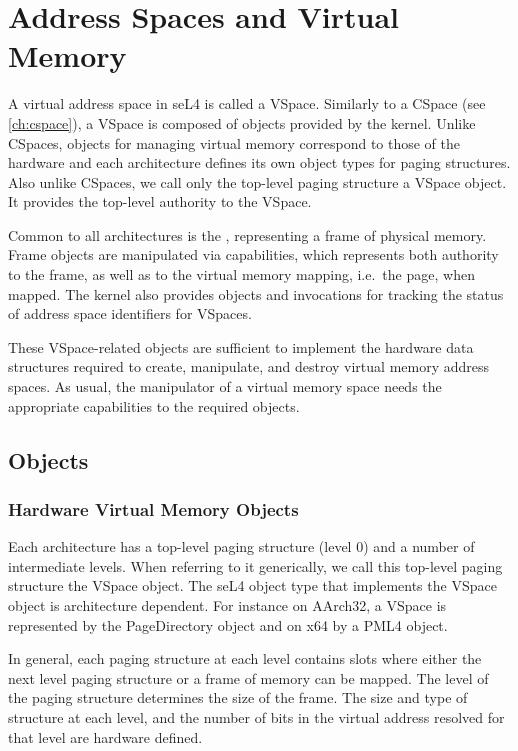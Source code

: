 %
%
%

\chapter{\label{ch:vspace}Address Spaces and Virtual Memory}

A virtual address space in seL4 is called a VSpace. Similarly to a CSpace (see \autoref{ch:cspace}),
a VSpace is composed of objects provided by the kernel. Unlike CSpaces, objects for managing virtual
memory correspond to those of the hardware and each architecture defines its own object types for
paging structures. Also unlike CSpaces, we call only the top-level paging structure a VSpace object.
It provides the top-level authority to the VSpace.

Common to all architectures is the , representing a frame of physical memory. Frame
objects are manipulated via  capabilities, which represents both authority to the frame,
as well as to the virtual memory mapping, i.e.\ the page, when mapped. The kernel also provides
 objects and  invocations for tracking the status of address space
identifiers for VSpaces.

These VSpace-related objects are sufficient to implement the hardware data structures required to
create, manipulate, and destroy virtual memory address spaces. As usual, the manipulator of a
virtual memory space needs the appropriate capabilities to the required objects.

\section{Objects}

\subsection{Hardware Virtual Memory Objects}

Each architecture has a top-level paging structure (level 0) and a number of intermediate levels.
When referring to it generically, we call this top-level paging structure the VSpace object. The
seL4 object type that implements the VSpace object is architecture dependent. For instance on
AArch32, a VSpace is represented by the PageDirectory object and on x64 by a PML4 object.

In general, each paging structure at each level contains slots where either the next level paging
structure or a frame of memory can be mapped. The level of the paging structure determines the size
of the frame. The size and type of structure at each level, and the number of bits in the virtual
address resolved for that level are hardware defined.


